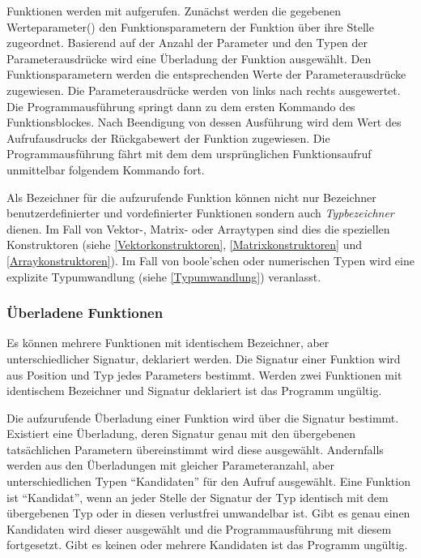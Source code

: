 Funktionen werden mit  aufgerufen. Zunächst werden die
gegebenen Werteparameter() den Funktionsparametern der Funktion über ihre Stelle zugeordnet.
Basierend auf der Anzahl der Parameter und den Typen der Parameterausdrücke wird eine Überladung der Funktion ausgewählt.
Den Funktionsparametern werden die entsprechenden Werte der Parameterausdrücke zugewiesen.
Die Parameterausdrücke werden von links nach rechts ausgewertet.
Die Programmausführung springt dann zu dem ersten
Kommando des Funktionsblockes. Nach Beendigung von dessen Ausführung wird dem Wert des Aufrufausdrucks der
Rückgabewert der Funktion zugewiesen. Die Programmausführung fährt mit dem dem ursprünglichen Funktionsaufruf
unmittelbar folgendem Kommando fort.

Als Bezeichner für die aufzurufende Funktion können nicht nur Bezeichner benutzerdefinierter und
vordefinierter Funktionen sondern auch \emph{Typbezeichner} dienen.
Im Fall von Vektor-, Matrix- oder Arraytypen sind dies die speziellen Konstruktoren
(siehe \ref{Vektorkonstruktoren}, \ref{Matrixkonstruktoren} und \ref{Arraykonstruktoren}).
Im Fall von boole'schen oder numerischen Typen wird eine explizite Typumwandlung (siehe
\ref{Typumwandlung}) veranlasst.


\subsubsection{Überladene Funktionen}\label{Ueberladene Funktionen}

Es können mehrere Funktionen mit identischem Bezeichner, aber unterschiedlicher Signatur,
deklariert werden. Die Signatur einer Funktion wird aus Position und Typ jedes Parameters
bestimmt. Werden zwei Funktionen mit identischem Bezeichner und Signatur deklariert ist
das Programm ungültig.

Die aufzurufende Überladung einer Funktion wird über die Signatur bestimmt. Existiert
eine Überladung, deren Signatur genau mit den übergebenen tatsächlichen Parametern
übereinstimmt wird diese ausgewählt. Andernfalls werden aus den Überladungen mit
gleicher Parameteranzahl, aber unterschiedlichen Typen "`Kandidaten"' für den
Aufruf ausgewählt. Eine Funktion ist "`Kandidat"', wenn an jeder Stelle der Signatur
der Typ identisch mit dem übergebenen Typ oder in diesen verlustfrei umwandelbar ist.
Gibt es genau einen Kandidaten wird dieser ausgewählt und die Programmausführung
mit diesem fortgesetzt. Gibt es keinen oder mehrere Kandidaten ist das Programm
ungültig.


